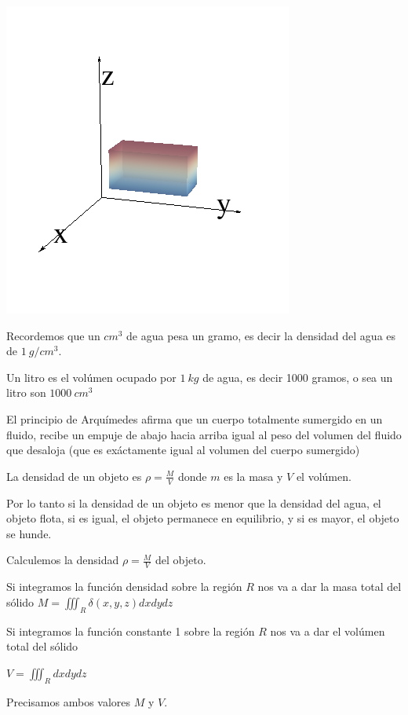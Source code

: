 \begin{center}
\includegraphics[scale=0.7]{images/04_analisis2/multiples3.png}
\end{center}

Recordemos que un $cm^3$ de agua pesa un gramo, es decir la densidad del agua es de $1 \ g/cm^3$.

Un litro es el volúmen ocupado por $1 \ kg$ de agua, es decir 1000 gramos, o sea un litro son $1000 \ cm^3$

El principio de Arquímedes afirma que un cuerpo totalmente sumergido en un fluido, recibe un empuje de abajo hacia arriba igual al peso del volumen del fluido que desaloja (que es exáctamente igual al volumen del cuerpo sumergido)

La densidad de un objeto es $\rho = \frac{M}{V}$ donde $m$ es la masa y $V$ el volúmen.

Por lo tanto si la densidad de un objeto es menor que la densidad del agua, el objeto flota, si es igual, el objeto permanece en equilibrio, y si es mayor, el objeto se hunde.

Calculemos la densidad $\rho = \frac{M}{V}$ del objeto.

Si integramos la función densidad sobre la región $R$ nos va a dar la masa total del sólido 
$M = \iiint_R \delta(x,y,z) dxdydz$

Si integramos la función constante 1 sobre la región $R$ nos va a dar el volúmen total del sólido

$V = \iiint_R dxdydz$

Precisamos ambos valores $M$ y $V$.

